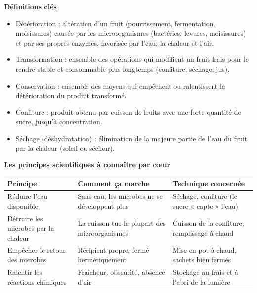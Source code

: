 \documentclass[11pt]{article}
\newcommand{\cle}[1]{{\popxbold\color{popdark}#1}}
\begin{document}
\begin{bilan}
\textbf{Définitions clés}
\begin{itemize}
  \item \cle{Détérioration} : altération d'un fruit (pourrissement, fermentation, moisissures) causée par les \cle{microorganismes} (bactéries, levures, moisissures) et par ses propres \cle{enzymes}, favorisée par l'eau, la chaleur et l'air.
  \item \cle{Transformation} : ensemble des opérations qui modifient un fruit frais pour le rendre stable et consommable plus longtemps (confiture, séchage, jus).
  \item \cle{Conservation} : ensemble des moyens qui empêchent ou ralentissent la détérioration du produit transformé.
  \item \cle{Confiture} : produit obtenu par cuisson de fruits avec une forte quantité de sucre, jusqu'à concentration.
  \item \cle{Séchage} (déshydratation) : élimination de la majeure partie de l'eau du fruit par la chaleur (soleil ou séchoir).
\end{itemize}

\textbf{Les principes scientifiques à connaître par c\oe ur}
\begin{center}
\begin{tabularx}{\linewidth}{|l|X|X|}
\hline
\rowcolor{popblueL} \textbf{Principe} & \textbf{Comment ça marche} & \textbf{Technique concernée} \\
\hline
Réduire l'eau disponible & Sans eau, les microbes ne se développent plus & Séchage, confiture (le sucre « capte » l'eau) \\
\hline
Détruire les microbes par la chaleur & La cuisson tue la plupart des microorganismes & Cuisson de la confiture, remplissage à chaud \\
\hline
Empêcher le retour des microbes & Récipient propre, fermé hermétiquement & Mise en pot à chaud, sachets bien fermés \\
\hline
Ralentir les réactions chimiques & Fraîcheur, obscurité, absence d'air & Stockage au frais et à l'abri de la lumière \\
\hline
\end{tabularx}
\end{center}


\end{bilan}
\end{document}
